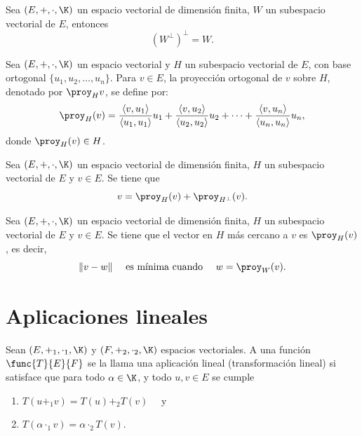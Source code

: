 \documentclass[a4,11pt]{aleph-notas}
\begin{document}
\begin{teo}
    Sea $(E,+,\cdot,\K)$ un espacio vectorial de dimensión finita, $W$ un subespacio vectorial de $E$, entonces 
    \[
    \left(W^\perp\right)^\perp =  W.
    \]
\end{teo}

\begin{defi}
    Sea $(E,+,\cdot,\K)$ un espacio vectorial y
    $H$ un subespacio vectorial de $E$, con base ortogonal $\{u_1, u_2, \ldots, u_n \}$. Para $v \in E$, la proyección ortogonal de $v$ sobre $H$, denotado por $\proy_H v$, se define por:
    \[
       \proy_H( v) = 
       \dfrac{\langle v,u_1 \rangle}{\langle u_1, u_1 \rangle}u_1 +
       \dfrac{\langle v,u_2 \rangle}{\langle u_2, u_2 \rangle}u_2 +
       \cdots +
       \dfrac{\langle v,u_n \rangle}{\langle u_n, u_n \rangle}u_n,
    \]
    donde $\proy_H (v) \in H$.
\end{defi}


\begin{teo}
    Sea $(E,+,\cdot,\K)$ un espacio vectorial de dimensión finita, $H$ un subespacio vectorial de $E$ y $v \in E$. Se tiene que
    \[
        v = \proy_H( v) + \proy_{H^\perp}( v).
    \]
\end{teo}

\begin{teo}
    Sea $(E,+,\cdot,\K)$ un espacio vectorial de dimensión finita, $H$ un subespacio vectorial de $E$ y $v \in E$. Se tiene que el vector en $H$ más cercano a $v$ es $\proy_H(v)$, es decir,
    \[
    \|v-w\| \quad \text{ es mínima cuando } \quad w = \proy_W(v).
    \]
\end{teo}


\section{Aplicaciones lineales}

\begin{defi}
    Sean $(E,+_1,\cdot_1,\K)$ y $(F,+_2,\cdot_2,\K)$ espacios vectoriales. A una función $\func{T}{E}{F}$ se la llama una aplicación lineal (transformación lineal) si satisface que para todo $\alpha \in \K$, y todo $u,v \in E$ se cumple
    \begin{enumerate}
    \item 
        $T(u +_1 v) = T(u) +_2 T(v)\quad$ y
    \item 
        $T(\alpha \cdot_1 v ) = \alpha \cdot_2 T(v)$.
    \end{enumerate}
\end{defi}
\end{document}
